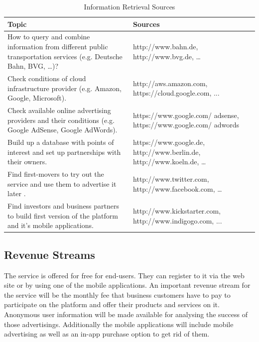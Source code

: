 \documentclass[a4paper]{article}
\begin{document}
\begin{table}[ht]
\begin{tabular}{|p{}|p{}|}
\hline
\textbf{Topic} & \textbf{Sources} \\
\hline
     How to query and combine information from different public transportation services (e.g. Deutsche Bahn, BVG, …)?   &  http://www.bahn.de, http://www.bvg.de, … \\
\hline
     Check conditions of cloud infrastructure provider (e.g. Amazon, Google, Microsoft). 
    & http://aws.amazon.com, https://cloud.google.com, ... \\
\hline    
     Check available online advertising providers and their conditions (e.g. Google AdSense, Google AdWords).
    & https://www.google.com/ adsense, https://www.google.com/ adwords \\
\hline
     Build up a database with points of interest and set up partnerships with their owners.
    & https://www.google.de, http://www.berlin.de, http://www.koeln.de, … \\
\hline
     Find first-­movers to try out the service and use them to advertise it later . 
    & http://www.twitter.com, http://www.facebook.com, … \\
\hline
    Find investors and business partners to build first version of the platform and it's mobile applications.
    & http://www.kickstarter.com, http://www.indigogo.com, ... \\
\hline    
\end{tabular}
\caption{Information Retrieval Sources}
\label{tab:inforetrieval}
\end{table}

\subsection{Revenue Streams}
\label{subsec:revenue}

The service is offered for free for end-users. They can register to it via the web site or by using one of the mobile applications. An important revenue stream for the service will be the monthly fee that business customers have to pay to participate on the platform and offer their products and services on it. Anonymous user information will be made available for analysing the success of those advertisings. Additionally the mobile applications will include mobile advertising as well as an in-app purchase option to get rid of them. 

\end{document}
